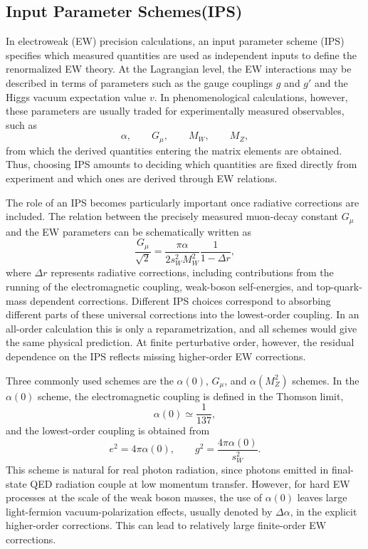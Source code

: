 \subsection{Input Parameter Schemes(IPS)}
In electroweak (EW) precision calculations, an input parameter scheme (IPS) specifies which measured quantities are used as independent inputs to define the renormalized EW theory. At the Lagrangian level, the EW interactions may be described in terms of parameters such as the gauge couplings $g$ and $g'$ and the Higgs vacuum expectation value $v$. In phenomenological calculations, however, these parameters are usually traded for experimentally measured observables, such as
$$
\alpha,\qquad G_\mu,\qquad M_W,\qquad M_Z,
$$
from which the derived quantities entering the matrix elements are obtained. 
Thus, choosing IPS amounts to deciding which quantities are fixed directly from experiment and which ones are derived through EW relations.

The role of an IPS becomes particularly important once radiative corrections are included. The relation between the precisely measured muon-decay constant $G_\mu$ and the EW parameters can be schematically written as
$$
\frac{G_\mu}{\sqrt{2}}
=
\frac{\pi\alpha}{2s_W^2 M_W^2}
\frac{1}{1-\Delta r},
$$
where $\Delta r$ represents radiative corrections, including contributions from the running of the electromagnetic coupling, weak-boson self-energies, and top-quark-mass dependent corrections. Different IPS choices correspond to absorbing different parts of these universal corrections into the lowest-order coupling. In an all-order calculation this is only a reparametrization, and all schemes would give the same physical prediction. At finite perturbative order, however, the residual dependence on the IPS reflects missing higher-order EW corrections.

Three commonly used schemes are the $\alpha(0)$, $G_\mu$, and $\alpha(M_Z^2)$ schemes. In the $\alpha(0)$ scheme, the electromagnetic coupling is defined in the Thomson limit,
$$
\alpha(0) \simeq \frac{1}{137},
$$
and the lowest-order coupling is obtained from
$$
e^2 = 4\pi\alpha(0),
\qquad
g^2 = \frac{4\pi\alpha(0)}{s_W^2}.
$$
This scheme is natural for real photon radiation, since photons emitted in final-state QED radiation couple at low momentum transfer. However, for hard EW processes at the scale of the weak boson masses, the use of $\alpha(0)$ leaves large light-fermion vacuum-polarization effects, usually denoted by $\Delta\alpha$, in the explicit higher-order corrections. This can lead to relatively large finite-order EW corrections.

